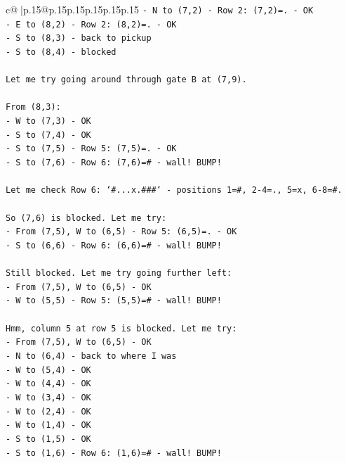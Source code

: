 \documentclass{article}
\begin{document}
{\begin{supertabular}{c@{$\;$}|p{.15\linewidth}@{}p{.15\linewidth}p{.15\linewidth}p{.15\linewidth}p{.15\linewidth}p{.15\linewidth}}
{{{\texttt{{-} N to (7,2) {-} Row 2: (7,2)=. {-} OK} \\
\texttt{{-} E to (8,2) {-} Row 2: (8,2)=. {-} OK} \\
\texttt{{-} S to (8,3) {-} back to pickup} \\
\texttt{{-} S to (8,4) {-} blocked} \\
\\ 
\texttt{Let me try going around through gate B at (7,9).} \\
\\ 
\texttt{From (8,3):} \\
\texttt{{-} W to (7,3) {-} OK} \\
\texttt{{-} S to (7,4) {-} OK} \\
\texttt{{-} S to (7,5) {-} Row 5: (7,5)=. {-} OK} \\
\texttt{{-} S to (7,6) {-} Row 6: (7,6)=\# {-} wall! BUMP!} \\
\\ 
\texttt{Let me check Row 6: `\#...x.\#\#\#` {-} positions 1=\#, 2{-}4=., 5=x, 6{-}8=\#.} \\
\\ 
\texttt{So (7,6) is blocked. Let me try:} \\
\texttt{{-} From (7,5), W to (6,5) {-} Row 5: (6,5)=. {-} OK} \\
\texttt{{-} S to (6,6) {-} Row 6: (6,6)=\# {-} wall! BUMP!} \\
\\ 
\texttt{Still blocked. Let me try going further left:} \\
\texttt{{-} From (7,5), W to (6,5) {-} OK} \\
\texttt{{-} W to (5,5) {-} Row 5: (5,5)=\# {-} wall! BUMP!} \\
\\ 
\texttt{Hmm, column 5 at row 5 is blocked. Let me try:} \\
\texttt{{-} From (7,5), W to (6,5) {-} OK} \\
\texttt{{-} N to (6,4) {-} back to where I was} \\
\texttt{{-} W to (5,4) {-} OK} \\
\texttt{{-} W to (4,4) {-} OK} \\
\texttt{{-} W to (3,4) {-} OK} \\
\texttt{{-} W to (2,4) {-} OK} \\
\texttt{{-} W to (1,4) {-} OK} \\
\texttt{{-} S to (1,5) {-} OK} \\
\texttt{{-} S to (1,6) {-} Row 6: (1,6)=\# {-} wall! BUMP!} \\
}}}
\end{supertabular}}
\end{document}
